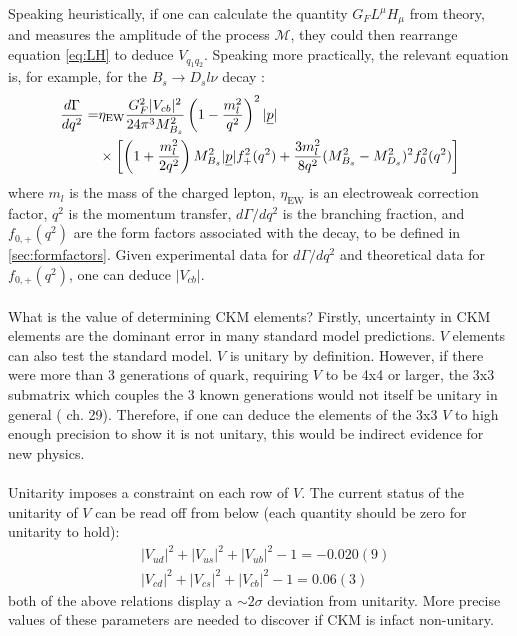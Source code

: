 Speaking heuristically, if one can calculate the quantity $G_F L^{\mu} H_{\mu}$ from theory, and measures the amplitude of the process $\mathcal{M}$, they could then rearrange equation \eqref{eq:LH} to deduce $V_{q_1q_2}$. Speaking more practically, the relevant equation is, for example, for the $B_s \to D_s l\nu$ decay \cite{Na:2015kha}:
\begin{align}
	{d\Gamma \over dq^2} =& \eta_{\text{EW}} {G^2_F |V_{cb}|^2 \over 24\pi^3 M_{B_s}^2} \left( 1 - {m_l^2\over q^2}\right)^2 |\underline{p}| \\
	&\times \left[ \left(1+{m_l^2\over 2q^2}\right) M_{B_s}^2 |\underline{p}| f^2_+(q^2) + {3m_l^2\over 8q^2}(M_{B_s}^2 - M_{D_s}^2)^2 f_0^2(q^2)\right]
\end{align}
where $m_l$ is the mass of the charged lepton, $\eta_{\text{EW}}$ is an electroweak correction factor, $q^2$ is the momentum transfer, ${d\Gamma/dq^2}$ is the branching fraction, and $f_{0,+}(q^2)$ are the form factors associated with the decay, to be defined in \ref{sec:formfactors}. Given experimental data for ${d\Gamma/dq^2}$ and theoretical data for $f_{0,+}(q^2)$, one can deduce $|V_{cb}|$.
\\ \\
What is the value of determining CKM elements? Firstly, uncertainty in CKM elements are the dominant error in many standard model predictions. $V$ elements can also test the standard model. $V$ is unitary by definition. However, if there were more than 3 generations of quark, requiring $V$ to be 4x4 or larger, the 3x3 submatrix which couples the 3 known generations
would not itself be unitary in general (\cite{Schwartz:2013pla} ch. 29). Therefore, if one can deduce the elements of the 3x3 $V$ to high enough precision to show it is not unitary, this would be indirect evidence for new physics. 
\\ \\
Unitarity imposes a constraint on each row of $V$. The current status of the unitarity of $V$ can be read off from below (each quantity should be zero for unitarity to hold)\cite{Aoki:2016frl}:
\begin{align}
	\nonumber
	&|V_{ud}|^2 + |V_{us}|^2 + |V_{ub}|^2 - 1 = -0.020(9) \\ 
	&|V_{cd}|^2 + |V_{cs}|^2 + |V_{cb}|^2 - 1 = 0.06(3)
\end{align}
both of the above relations display a $\sim2\sigma$ deviation from unitarity. More precise values of these parameters are needed to discover if CKM is infact non-unitary.
\\ \\
